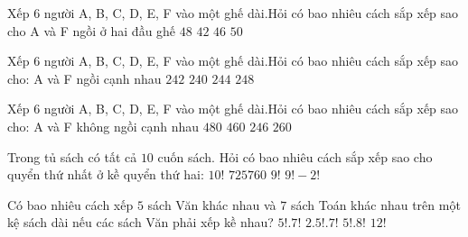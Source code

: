 \begin{ex}
	Xếp 6 người A, B, C, D, E, F vào một ghế dài.Hỏi có bao nhiêu cách sắp xếp sao cho A và F ngồi ở hai đầu ghế
	\choice
	{\True $48$}
	{$42$}
	{$46$}
	{$50$}
\end{ex}

\begin{ex}
	Xếp 6 người A, B, C, D, E, F vào một ghế dài.Hỏi có bao nhiêu cách sắp xếp sao cho: A và F ngồi cạnh nhau
	\choice
	{$242$}
	{\True $240$}
	{$244$}
	{$248$}
\end{ex}

\begin{ex}
	Xếp 6 người A, B, C, D, E, F vào một ghế dài.Hỏi có bao nhiêu cách sắp xếp sao cho: A và F không ngồi cạnh nhau
	\choice
	{\True $480$}
	{$460$}
	{$246$}
	{$260$}
\end{ex}

\begin{ex}
	Trong tủ sách có tất cả $10$ cuốn sách. Hỏi có bao nhiêu cách sắp xếp sao cho quyển thứ nhất ở kề quyển thứ hai:
	\choice
	{$10!$}
	{\True $725760$}
	{$9!$}
	{$9! - 2!$}
\end{ex}

\begin{ex}
	Có bao nhiêu cách xếp $5$ sách Văn khác nhau và $7$ sách Toán khác nhau trên một kệ sách dài nếu các sách Văn phải xếp kề nhau?
	\choice
	{$5!.7!$}
	{$2.5!.7!$}
	{\True $5!.8!$}
	{$12!$}
\end{ex}

